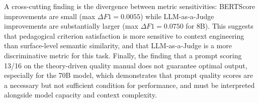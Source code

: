 \documentclass[conference,a4paper]{IEEEtran}
\begin{document}
A cross-cutting finding is the divergence 
between metric sensitivities: BERTScore 
improvements are small (max $\Delta F1 = 
0.0055$) while LLM-as-a-Judge improvements 
are substantially larger (max $\Delta F1 = 
0.0750$ for 8B). This suggests that 
pedagogical criterion satisfaction is more 
sensitive to context engineering than 
surface-level semantic similarity, and that 
LLM-as-a-Judge is a more discriminative 
metric for this task. Finally, the finding 
that a prompt scoring 13/16 on the 
theory-driven quality manual 
\cite{jacobsen2025promises} does not 
guarantee optimal output, especially for
the 70B model, which demonstrates that prompt
quality scores are a necessary but not 
sufficient condition for performance, and 
must be interpreted alongside model capacity 
and context complexity.



\end{document}

